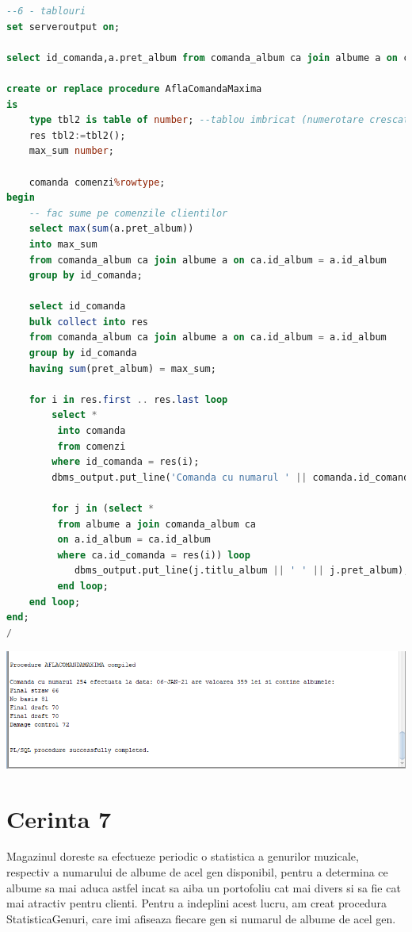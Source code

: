 \documentclass{article}
\begin{document}
\begin{lstlisting}[language=SQL, title=Cerinta 6]
--6 - tablouri
set serveroutput on;

select id_comanda,a.pret_album from comanda_album ca join albume a on ca.id_album = a.id_album;

create or replace procedure AflaComandaMaxima 
is
    type tbl2 is table of number; --tablou imbricat (numerotare crescatoare)
    res tbl2:=tbl2();
    max_sum number;
    
    comanda comenzi%rowtype;
begin
    -- fac sume pe comenzile clientilor
    select max(sum(a.pret_album)) 
    into max_sum
    from comanda_album ca join albume a on ca.id_album = a.id_album
    group by id_comanda;
     
    select id_comanda
    bulk collect into res
    from comanda_album ca join albume a on ca.id_album = a.id_album
    group by id_comanda
    having sum(pret_album) = max_sum;
     
    for i in res.first .. res.last loop
        select *
         into comanda
         from comenzi
        where id_comanda = res(i);
        dbms_output.put_line('Comanda cu numarul ' || comanda.id_comanda || ' efectuata la data: ' || comanda.data_comanda || ' are valoarea ' || max_sum || ' lei si contine albumele: ');
        
        for j in (select * 
         from albume a join comanda_album ca
         on a.id_album = ca.id_album
         where ca.id_comanda = res(i)) loop
            dbms_output.put_line(j.titlu_album || ' ' || j.pret_album);
         end loop;
    end loop;
end;
/
\end{lstlisting}

\vspace{0.5cm}

\includegraphics[width=\textwidth]{6.png}

\newpage
\section{Cerinta 7}
Magazinul doreste sa efectueze periodic o statistica a genurilor muzicale, respectiv a numarului de albume de acel gen disponibil, pentru a determina ce albume sa mai aduca astfel incat sa aiba un portofoliu cat mai divers si sa fie cat mai atractiv pentru clienti. Pentru a indeplini acest lucru, am creat procedura StatisticaGenuri, care imi afiseaza fiecare gen si numarul de albume de acel gen.
\end{document}
